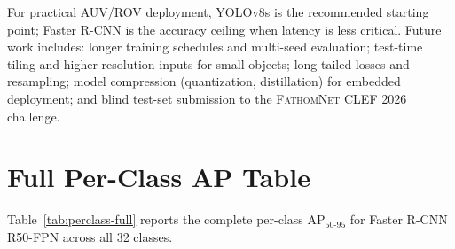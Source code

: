 \documentclass[11pt,a4paper]{article}
\newcommand{\dataset}{\textsc{FathomNet CLEF 2026}}
\begin{document}
For practical AUV/ROV deployment, YOLOv8s is the recommended starting point; Faster R-CNN is the accuracy ceiling when latency is less critical. Future work includes: longer training schedules and multi-seed evaluation; test-time tiling and higher-resolution inputs for small objects; long-tailed losses and resampling; model compression (quantization, distillation) for embedded deployment; and blind test-set submission to the \dataset{} challenge.

\appendix
\onecolumn

\section{Full Per-Class AP Table}
\label{app:perclass}
Table~\ref{tab:perclass-full} reports the complete per-class AP$_{50\text{-}95}$ for Faster R-CNN R50-FPN across all 32 classes.
\end{document}
